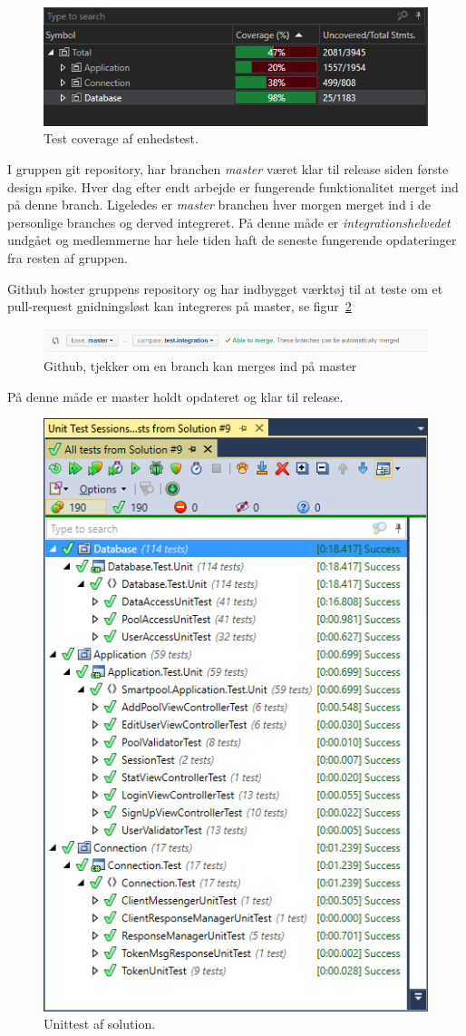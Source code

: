 \begin{figure}[h]
	\centering
	\includegraphics[width=0.8\linewidth]{figs/test/coverage}
	\caption{Test coverage af enhedstest.}
	\label{fig:coverage}
\end{figure}

I gruppen git repository, har branchen \textit{master} været klar til release siden første design spike. Hver dag efter endt arbejde er fungerende funktionalitet merget ind på denne branch. Ligeledes er \textit{master} branchen hver morgen merget ind i de personlige branches og derved integreret. På denne måde er \textit{integrationshelvedet} undgået og medlemmerne har hele tiden haft de seneste fungerende opdateringer fra resten af gruppen.

Github hoster gruppens repository og har indbygget værktøj til at teste om et pull-request gnidningsløst kan integreres på master, se figur~\ref{fig:gitmerge}

\begin{figure}[h]
\centering
\includegraphics[width=\linewidth]{figs/test/gitmerge.png}
\caption{Github, tjekker om en branch kan merges ind på master}
\label{fig:gitmerge}
\end{figure}

På denne måde er master holdt opdateret og klar til release.

\begin{figure}[h]
	\centering
	\includegraphics[width=0.5\linewidth]{figs/test/vsUnittest}
	\caption{Unittest af solution.}
	\label{fig:coverage}
\end{figure}






